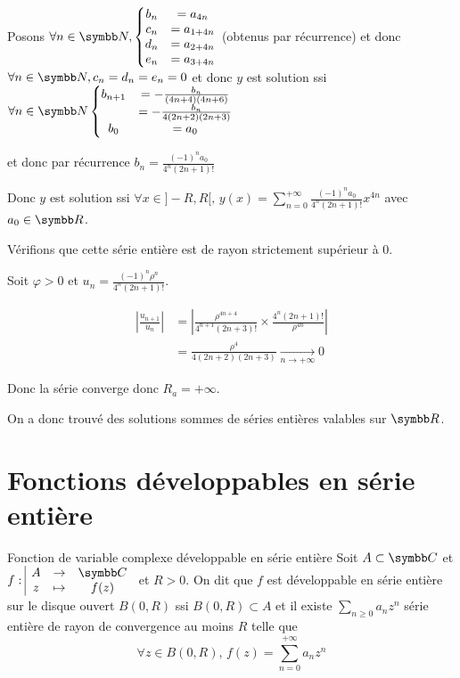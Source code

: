\begin{exemple}
    Posons $\forall n \in \N, \left\{ 
        \begin{matrix}
            b_n & = a_{4 n } \\
            c_n & = a_{ 1 + 4n} \\
            d_n & = a_{2 + 4n} \\
            e_n & = a_{3 + 4n}
        \end{matrix}
    \right.$ (obtenus par récurrence) et donc 
    $\forall n \in \N, c_n = d_n = e_n = 0$ et donc $y$ est solution ssi 
    $\forall n \in \N \left\{
        \begin{matrix}
            b_{n + 1} & = - \frac{b_n }{(4n + 4)(4n + 6)} \\
            & = - \frac{b_n }{4(2n + 2)(2n + 3)} \\
            b_0 & = a_0
        \end{matrix}
    \right.$

    et donc par récurrence $ b_n = \frac{(-1)^n a_0}{4^n(2n + 1)!}$
    
    Donc $y$ est solution ssi $\forall x \in ]-R, R[, \, y(x) = \sum_{n = 0}^{+\infty} \frac{(-1)^n a_0}{4^n (2n + 1)!} x^{4n}$
    avec $a_0 \in \R$. 

    Vérifions que cette série entière est de rayon strictement supérieur à 0.

    Soit $\varphi > 0$ et $u_n = \frac{(-1)^n \rho^n}{4^n (2n + 1)!}$.

    \begin{align}
        \left| \frac{u_{n + 1}}{u_n} \right| & = \left| \frac{\rho^{4n + 4}}{4^{n + 1} (2n + 3)!} \times \frac{4^n (2n + 1)!}{\rho^{4n} } \right| \\
        & = \frac{\rho^4 }{4 (2n + 2)(2n + 3)} \xrightarrow[n \to + \infty]{} 0
    \end{align}

    Donc la série converge donc $R_a = + \infty$.

    On a donc trouvé des solutions sommes de séries entières valables sur $\R$.
\end{exemple}

\section{Fonctions développables en série entière}

\begin{definitionnt}{Fonction de variable complexe développable en série entière}{}
    Soit $A \subset \C$ et $\fonction{f}{A}{\C}{z}{f(z)}$ et $R > 0$. On dit que $f$ est développable
    en série entière sur le disque ouvert $B(0, R)$ ssi $B(0, R) \subset A$ et il 
    existe $\sum_{n \geqslant 0 } a_n z^n$ série entière de rayon de convergence au moins $R$ telle que
    \[\forall z \in B(0, R), \, f(z) = \sum_{n = 0}^{+\infty} a_n z^n\]
\end{definitionnt}

